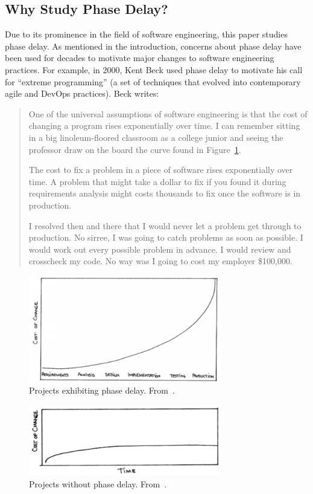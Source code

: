 \documentclass{sig-alternate}
\newcommand{\fig}[1]{Figure~\ref{fig:#1}}
\begin{document}
\subsection{Why Study Phase Delay?}
Due to its prominence in the field of software engineering,
this paper studies phase delay. As mentioned in the introduction, concerns about phase delay have
been used for decades to motivate major changes to software engineering practices. For example,
in 2000, Kent Beck used phase delay to motivate his call for ``extreme programming'' (a set of techniques
that evolved into contemporary agile and DevOps practices). Beck writes:
\begin{quote}
One of the universal assumptions of software engineering is that the cost of changing a program rises exponentially over time. I can remember sitting in a big linoleum-floored classroom as a college junior and seeing the professor draw on the board the curve found in \fig{curve1}.

The cost to fix a problem in a piece of software rises exponentially over time. A problem that might take a dollar to fix if you found it during requirements analysis might costs thousands to fix once the software is in production.

I resolved then and there that I would never let a problem get through to production. No sirree, I was going to catch problems as soon as possible. I would work out every possible problem in advance. I would review and crosscheck my code. No way was I going to cost my employer \$100,000.~\cite{beck00}
\end{quote}

\begin{figure}
 \includegraphics[width=3.3in]{beckB4.png}
 \caption{Projects exhibiting phase delay. From~\cite{beck00}.}\label{fig:curve1}
 \end{figure}
\begin{figure}
 \includegraphics[width=3.3in]{beckAFTER.png}
 \caption{Projects without   phase delay. From~\cite{beck00}.}\label{fig:curve2}
\end{figure}
\end{document}
